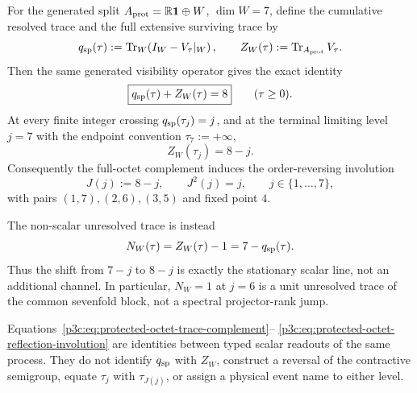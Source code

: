 \documentclass[12pt,a4paper]{article}
\begin{document}
\begin{theorem}
\label{p3c:thm:protected-octet-trace-reflection}
For the generated split
\(A_{\rm prot}=\mathbb R\mathbf1\oplus W\), \(\dim W=7\), define the
cumulative resolved trace and the full extensive surviving trace by
\[
 q_{\rm sp}(\tau)
 :=\operatorname{Tr}_W\!\left(I_W-V_\tau|_W\right),
 \qquad
 Z_W(\tau):=\operatorname{Tr}_{A_{\rm prot}}V_\tau.
\]
Then the same generated visibility operator gives the exact identity
\begin{equation}
\label{p3c:eq:protected-octet-trace-complement}
 \boxed{q_{\rm sp}(\tau)+Z_W(\tau)=8}
 \qquad(\tau\ge0).
\end{equation}
At every finite integer crossing \(q_{\rm sp}(\tau_j)=j\), and at the
terminal limiting level \(j=7\) with the endpoint convention
\(\tau_7:=+\infty\),
\begin{equation}
\label{p3c:eq:protected-octet-reflection-levels}
 \boxed{Z_W(\tau_j)=8-j.}
\end{equation}
Consequently the full-octet complement induces the order-reversing
involution
\begin{equation}
\label{p3c:eq:protected-octet-reflection-involution}
 \boxed{J(j):=8-j,\qquad J^2(j)=j,}
 \qquad j\in\{1,\ldots,7\},
\end{equation}
with pairs \((1,7),(2,6),(3,5)\) and fixed point \(4\).

The non-scalar unresolved trace is instead
\begin{equation}
\label{p3c:eq:w-only-versus-full-octet-residual}
 N_W(\tau)=Z_W(\tau)-1=7-q_{\rm sp}(\tau).
\end{equation}
Thus the shift from \(7-j\) to \(8-j\) is exactly the stationary scalar
line, not an additional channel.  In particular, \(N_W=1\) at \(j=6\) is
a unit unresolved trace of the common sevenfold block, not a spectral
projector-rank jump.

Equations~\eqref{p3c:eq:protected-octet-trace-complement}--
\eqref{p3c:eq:protected-octet-reflection-involution} are identities between
typed scalar readouts of the same process.  They do not identify
\(q_{\rm sp}\) with \(Z_W\), construct a reversal of the contractive
semigroup, equate \(\tau_j\) with \(\tau_{J(j)}\), or assign a physical event
name to either level.
\end{theorem}
\end{document}
